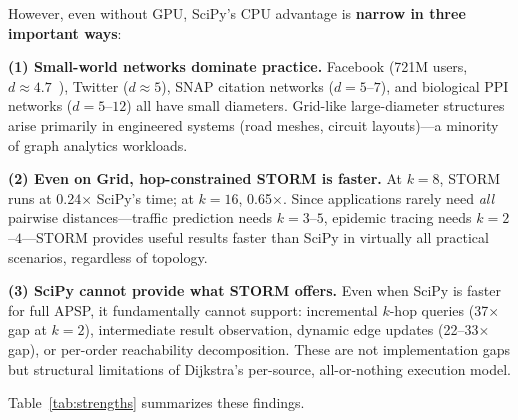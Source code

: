 \documentclass[journal]{IEEEtran}
\begin{document}
However, even without GPU, SciPy's CPU advantage is \textbf{narrow in three important ways}:

\textbf{(1) Small-world networks dominate practice.} Facebook (721M users, $d \approx 4.7$~\cite{backstrom2012}), Twitter ($d \approx 5$), SNAP citation networks ($d = 5$--$7$), and biological PPI networks ($d = 5$--$12$) all have small diameters. Grid-like large-diameter structures arise primarily in engineered systems (road meshes, circuit layouts)---a minority of graph analytics workloads.

\textbf{(2) Even on Grid, hop-constrained STORM is faster.} At $k=8$, STORM runs at 0.24$\times$ SciPy's time; at $k=16$, 0.65$\times$. Since applications rarely need \emph{all} pairwise distances---traffic prediction needs $k=3$--$5$, epidemic tracing needs $k=2$--$4$---STORM provides useful results faster than SciPy in virtually all practical scenarios, regardless of topology.

\textbf{(3) SciPy cannot provide what STORM offers.} Even when SciPy is faster for full APSP, it fundamentally cannot support: incremental $k$-hop queries (37$\times$ gap at $k=2$), intermediate result observation, dynamic edge updates (22--33$\times$ gap), or per-order reachability decomposition. These are not implementation gaps but structural limitations of Dijkstra's per-source, all-or-nothing execution model.

Table~\ref{tab:strengths} summarizes these findings.
\end{document}
